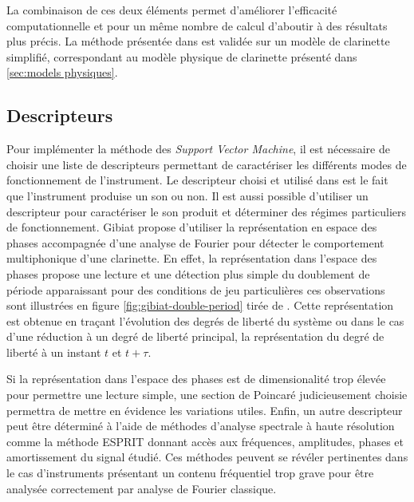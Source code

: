 \documentclass[atiam, article]{rapport} %
\begin{document}
La combinaison de ces deux éléments permet d'améliorer l'efficacité computationnelle et pour un même nombre de calcul d'aboutir à des résultats plus précis. La méthode présentée dans \cite{missoum_explicit_2014} est validée sur un modèle de clarinette simplifié, correspondant au modèle physique de clarinette présenté dans \ref{sec:models physiques}.


\subsection{Descripteurs}

Pour implémenter la méthode des \textit{Support Vector Machine}, il est nécessaire de choisir une liste de descripteurs permettant de caractériser les différents modes de fonctionnement de l'instrument. 
Le descripteur choisi et utilisé dans \cite{missoum_explicit_2014} est le fait que l'instrument produise un son ou non. 
Il est aussi possible d'utiliser un descripteur pour caractériser le son produit et déterminer des régimes particuliers de fonctionnement. 
Gibiat \cite{gibiat_phase_1988} propose d'utiliser la représentation en espace des phases accompagnée d'une analyse de Fourier pour détecter le comportement multiphonique d'une clarinette. 
En effet, la représentation dans l'espace des phases propose une lecture et une détection plus simple du doublement de période apparaissant pour des conditions de jeu particulières ces observations sont illustrées en figure \ref{fig:gibiat-double-period} tirée de \cite{gibiat_phase_1988}. 
Cette représentation est obtenue en traçant l'évolution des degrés de liberté du système ou dans le cas d'une réduction à un degré de liberté principal, la représentation du degré de liberté à un instant $t$ et $t + \tau$. 

Si la représentation dans l'espace des phases est de dimensionalité trop élevée pour permettre une lecture simple, une section de Poincaré judicieusement choisie permettra de mettre en évidence les variations utiles. 
Enfin, un autre descripteur peut être déterminé à l'aide de méthodes d'analyse spectrale à haute résolution comme la méthode ESPRIT \cite{ESPRIT} donnant accès aux fréquences, amplitudes, phases et amortissement du signal étudié.
Ces méthodes peuvent se révéler pertinentes dans le cas d'instruments présentant un contenu fréquentiel trop grave pour être analysée correctement par analyse de Fourier classique.
\end{document}
